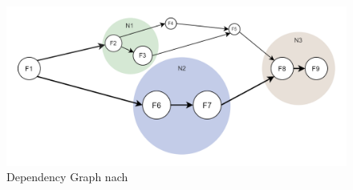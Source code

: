 \documentclass[a4paper,twoside,11pt, pagesize]{scrartcl}
\begin{document}
\begin{figure}[H]
\caption{Dependency Graph nach \cite{shafiei2020serverless}}
\label{fig:dependencyGraph}
\centering
\includegraphics[width=1\textwidth]{DependencyGraph}
\end{figure}
\end{document}

